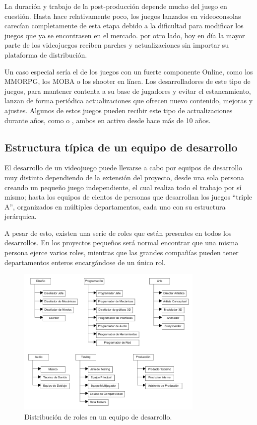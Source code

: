 La duración y trabajo de la post-producción depende mucho del juego en cuestión. Hasta hace relativamente poco, los juegos lanzados en videoconsolas carecían completamente de esta etapa debido a la dificultad para modificar los juegos que ya se encontrasen en el mercado. por otro lado, hoy en día la mayor parte de los videojuegos reciben parches y actualizaciones sin importar su plataforma de distribución\cite{development_and_production}.

Un caso especial sería el de los juegos con un fuerte componente Online, como los MMORPG, los MOBA o los shooter en línea. Los desarrolladores de este tipo de juegos, para mantener contenta a su base de jugadores y evitar el estancamiento, lanzan de forma periódica actualizaciones que ofrecen nuevo contenido, mejoras y ajustes. Algunos de estos juegos pueden recibir este tipo de actualizaciones durante años, como  o , ambos en activo desde hace más de 10 años.

\subsection{Estructura típica de un equipo de desarrollo}
El desarrollo de un videojuego puede llevarse a cabo por equipos de desarrollo muy distinto dependiendo de la extensión del proyecto, desde una sola persona creando un pequeño juego independiente, el cual realiza todo el trabajo por sí mismo; hasta los equipos de cientos de personas que desarrollan los juegos ``triple A'', organizados en múltiples departamentos, cada uno con su estructura jerárquica.

A pesar de esto, existen una serie de roles que están presentes en todos los desarrollos. En los proyectos pequeños será normal encontrar que una misma persona ejerce varios roles, mientras que las grandes compañías pueden tener departamentos enteros encargándose de un único rol.

\begin{figure}[h]
    \centering
    \includegraphics[width=0.8\textwidth]{images/estadodelarte/desarrollo/table-roles}
    \caption{Distribución de roles en un equipo de desarrollo.}
\end{figure}

